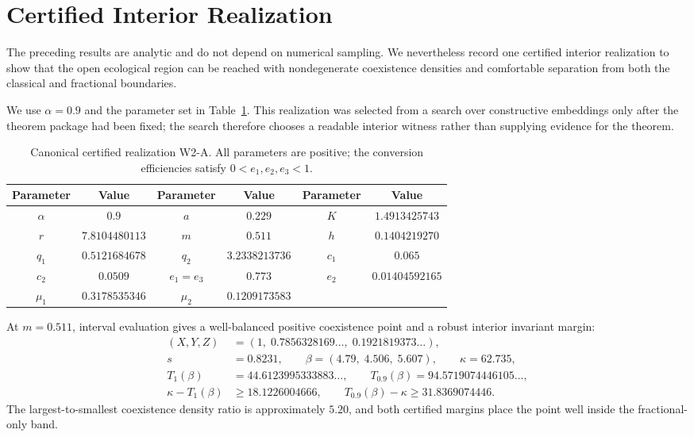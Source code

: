 \section{Certified Interior Realization}\label{sec:certified}

The preceding results are analytic and do not depend on numerical sampling. We nevertheless record one certified interior realization to show that the open ecological region can be reached with nondegenerate coexistence densities and comfortable separation from both the classical and fractional boundaries.

We use \(\alpha=0.9\) and the parameter set in Table~\ref{tab:w2a}. This realization was selected from a search over constructive embeddings only after the theorem package had been fixed; the search therefore chooses a readable interior witness rather than supplying evidence for the theorem.

\begin{table}[!htbp]
\centering
\caption{Canonical certified realization W2-A. All parameters are positive; the conversion efficiencies satisfy \(0<e_1,e_2,e_3<1\).}
\label{tab:w2a}
\begin{tabular}{cccccc}
\toprule
Parameter & Value & Parameter & Value & Parameter & Value\\
\midrule
\(\alpha\) & \(0.9\) &
\(a\) & \(0.229\) &
\(K\) & \(1.4913425743\)\\
\(r\) & \(7.8104480113\) &
\(m\) & \(0.511\) &
\(h\) & \(0.1404219270\)\\
\(q_1\) & \(0.5121684678\) &
\(q_2\) & \(3.2338213736\) &
\(c_1\) & \(0.065\)\\
\(c_2\) & \(0.0509\) &
\(e_1=e_3\) & \(0.773\) &
\(e_2\) & \(0.01404592165\)\\
\(\mu_1\) & \(0.3178535346\) &
\(\mu_2\) & \(0.1209173583\) &
 & \\
\bottomrule
\end{tabular}
\end{table}

At \(m=0.511\), interval evaluation gives a well-balanced positive coexistence point and a robust interior invariant margin:
\begin{align}
 (X,Y,Z)&=(1,\;0.7856328169\ldots,\;0.1921819373\ldots),\label{eq:w2a-densities}\\
 s&=0.8231,\qquad \beta=(4.79,\;4.506,\;5.607),\qquad \kappa=62.735,\label{eq:w2a-invariants}\\
 T_1(\beta)&=44.6123995333883\ldots,\qquad
 T_{0.9}(\beta)=94.5719074446105\ldots,\\
 \kappa-T_1(\beta)&\ge18.1226004666,\qquad
 T_{0.9}(\beta)-\kappa\ge31.8369074446.\label{eq:w2a-margins}
\end{align}
The largest-to-smallest coexistence density ratio is approximately \(5.20\), and both certified margins place the point well inside the fractional-only band.

